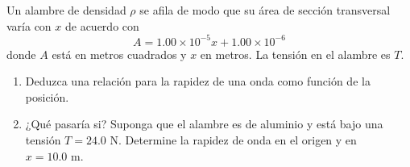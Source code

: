 \item Un alambre de densidad $\rho$ se afila de modo que su área de sección transversal varía con $x$ de acuerdo con
$$ A = 1.00 \times 10^{-5} x + 1.00 \times 10^{-6} $$
donde $A$ está en metros cuadrados y $x$ en metros. La tensión en el alambre es $T$.
\begin{enumerate}
    \item Deduzca una relación para la rapidez de una onda como función de la posición.
    \item ¿Qué pasaría si? Suponga que el alambre es de aluminio y está bajo una tensión $T = 24.0\text{ N}$. Determine la rapidez de onda en el origen y en $x = 10.0\text{ m}$.
\end{enumerate}